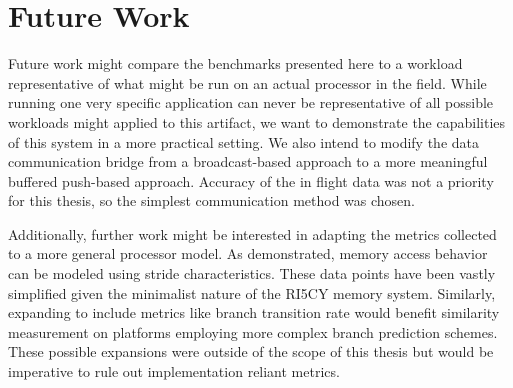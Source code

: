\documentclass[../bachelor_paper.tex]{subfiles}
\begin{document}
\chapter{Future Work}
    \label{ch:future}
Future work might compare the benchmarks presented here to a workload representative of what might be run on an actual processor in the field. While running one very specific application can never be representative of all possible workloads might applied to this artifact, we want to demonstrate the capabilities of this system in a more practical setting. We also intend to modify the data communication bridge from a broadcast-based approach to a more meaningful buffered push-based approach. Accuracy of the in flight data was not a priority for this thesis, so the simplest communication method was chosen. 

Additionally, further work might be interested in adapting the metrics collected to a more general processor model. As \cite{joshiDistillingEssenceProprietary2008} demonstrated, memory access behavior can be modeled using stride characteristics. These data points have been vastly simplified given the minimalist nature of the RI5CY memory system. Similarly, expanding to include metrics like branch transition rate \cite{haungsBranchTransitionRate2000} would benefit similarity measurement on platforms employing more complex branch prediction schemes. These possible expansions were outside of the scope of this thesis but would be imperative to rule out implementation reliant metrics.


\isstandalone



\fi
\end{document}
